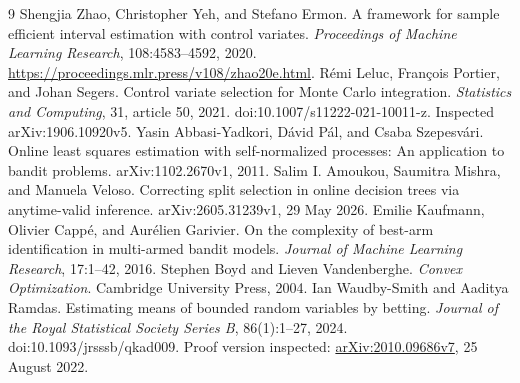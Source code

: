 \begin{thebibliography}{9}
 Shengjia Zhao, Christopher Yeh, and Stefano Ermon.
A framework for sample efficient interval estimation with control variates.
\emph{Proceedings of Machine Learning Research}, 108:4583--4592, 2020.
\url{https://proceedings.mlr.press/v108/zhao20e.html}.
 R\'emi Leluc, Fran\c{c}ois Portier, and Johan Segers.
Control variate selection for Monte Carlo integration.
\emph{Statistics and Computing}, 31, article 50, 2021.
doi:10.1007/s11222-021-10011-z. Inspected arXiv:1906.10920v5.
 Yasin Abbasi-Yadkori, D\'avid P\'al, and Csaba Szepesv\'ari.
Online least squares estimation with self-normalized processes: An application to bandit problems.
arXiv:1102.2670v1, 2011.
 Salim I. Amoukou, Saumitra Mishra, and Manuela Veloso.
Correcting split selection in online decision trees via anytime-valid inference.
arXiv:2605.31239v1, 29 May 2026.
 Emilie Kaufmann, Olivier Capp\'e, and Aur\'elien Garivier.
On the complexity of best-arm identification in multi-armed bandit models.
\emph{Journal of Machine Learning Research}, 17:1--42, 2016.
 Stephen Boyd and Lieven Vandenberghe.
\emph{Convex Optimization}. Cambridge University Press, 2004.
 Ian Waudby-Smith and Aaditya Ramdas.
Estimating means of bounded random variables by betting.
\emph{Journal of the Royal Statistical Society Series B}, 86(1):1--27, 2024.
doi:10.1093/jrsssb/qkad009. Proof version inspected:
\href{https://arxiv.org/abs/2010.09686v7}{arXiv:2010.09686v7}, 25 August 2022.
\end{thebibliography}
